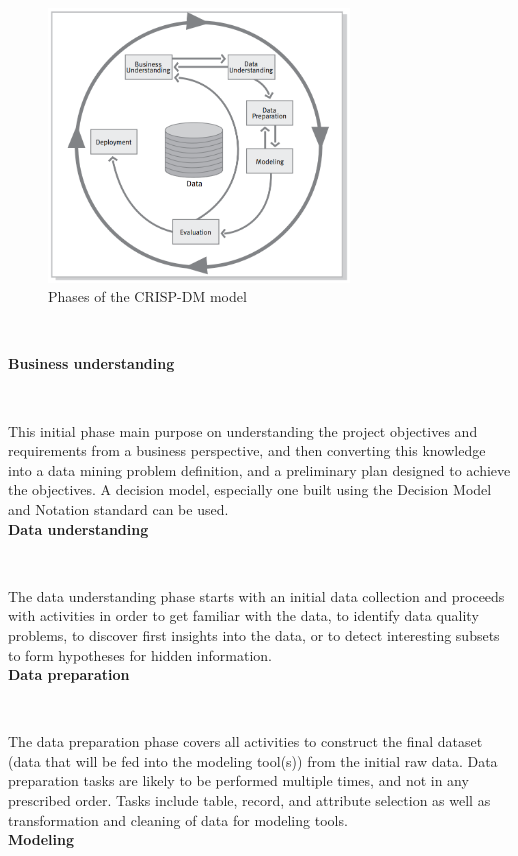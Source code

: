 \documentclass[11pt, a4papper]{report}
\theoremstyle{plain}
\theoremstyle{definition}
\theoremstyle{definition}
\theoremstyle{proposition}
\begin{document}
\begin{figure}[h]
\includegraphics[width=8cm]{crisp.png}
\centering
\caption{Phases of the CRISP-DM model}
\end{figure}
\

\textbf{Business understanding}

\

This initial phase main purpose on understanding the project objectives and requirements from a business perspective, and then converting this knowledge into a data mining problem definition, and a preliminary plan designed to achieve the objectives. A decision model, especially one built using the Decision Model and Notation standard can be used.
\\

\textbf{Data understanding}

\

The data understanding phase starts with an initial data collection and proceeds with activities in order to get familiar with the data, to identify data quality problems, to discover first insights into the data, or to detect interesting subsets to form hypotheses for hidden information.
\\

\textbf{Data preparation}

\

The data preparation phase covers all activities to construct the final dataset (data that will be fed into the modeling tool(s)) from the initial raw data. Data preparation tasks are likely to be performed multiple times, and not in any prescribed order. Tasks include table, record, and attribute selection as well as transformation and cleaning of data for modeling tools.
\\

\textbf{Modeling}
\end{document}
